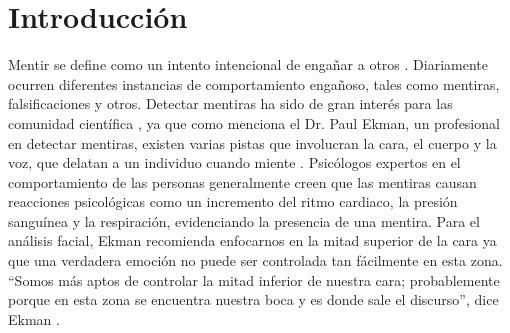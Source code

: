 
\chapter{Introducción} %

\label{Chapter1} %


\begin{onehalfspacing}


\newcommand{\keyword}[1]{\textbf{#1}}
\newcommand{\tabhead}[1]{\textbf{#1}}
\newcommand{\code}[1]{\texttt{#1}}
\newcommand{\file}[1]{\texttt{\bfseries#1}}
\newcommand{\option}[1]{\texttt{\itshape#1}}

Mentir se define como un intento intencional de engañar a otros \cite{Abouelenien2017DetectingModalities}. Diariamente ocurren diferentes instancias de comportamiento engañoso, tales como mentiras, falsificaciones y otros. Detectar mentiras ha sido de gran interés para las comunidad científica \cite{Abouelenien2016AnalyzingApproach}, ya que como menciona el Dr. Paul Ekman, un profesional en detectar mentiras, existen varias pistas que involucran la cara, el cuerpo y la voz, que delatan a un individuo cuando miente \cite{Bhaskaran2011LieLearning}. Psicólogos expertos en el comportamiento de las personas generalmente creen que las mentiras causan reacciones psicológicas como un incremento del ritmo cardiaco, la presión sanguínea y la respiración, evidenciando la presencia de una mentira. Para el análisis facial, Ekman recomienda enfocarnos en la mitad superior de la cara ya que una verdadera emoción no puede ser controlada tan fácilmente en esta zona. “Somos más aptos de controlar la mitad inferior de nuestra cara; probablemente porque en esta zona se encuentra nuestra boca y es donde sale el discurso”, dice Ekman \cite{Bhaskaran2011LieLearning}.\\


\end{onehalfspacing}
